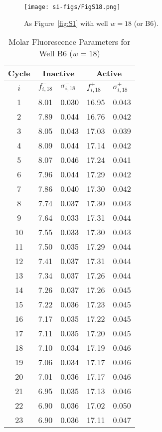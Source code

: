                 \begin{figure}
                    \centering
                    \texttt{[image: si-figs/FigS18.png]}
                    \caption{
                        As Figure~\ref{fig:S1} with well $w=18$ (or B6).
                    }
                \end{figure}
                \clearpage
    \begin{table}
        \caption{Molar Fluorescence Parameters for Well B6 ($w=18$)}
        \centering
        \begin{tabular}{c|ll|ll}
            Cycle & \multicolumn{2}{c|}{Inactive} & \multicolumn{2}{c}{Active} \\
            \hline
            $i$ & $f_{i,18}^{-}$ & $\sigma_{i,18}^{-}$ &  $f_{i,18}^{+}$ & $\sigma_{i,18}^{+}$ \\
            \hline
    1 & 8.01 & 0.030 & 16.95 & 0.043 \\
2 & 7.89 & 0.044 & 16.76 & 0.042 \\
3 & 8.05 & 0.043 & 17.03 & 0.039 \\
4 & 8.09 & 0.044 & 17.14 & 0.042 \\
5 & 8.07 & 0.046 & 17.24 & 0.041 \\
6 & 7.96 & 0.044 & 17.29 & 0.042 \\
7 & 7.86 & 0.040 & 17.30 & 0.042 \\
8 & 7.74 & 0.037 & 17.30 & 0.043 \\
9 & 7.64 & 0.033 & 17.31 & 0.044 \\
10 & 7.55 & 0.033 & 17.30 & 0.043 \\
11 & 7.50 & 0.035 & 17.29 & 0.044 \\
12 & 7.41 & 0.037 & 17.31 & 0.044 \\
13 & 7.34 & 0.037 & 17.26 & 0.044 \\
14 & 7.26 & 0.037 & 17.26 & 0.045 \\
15 & 7.22 & 0.036 & 17.23 & 0.045 \\
16 & 7.17 & 0.035 & 17.22 & 0.045 \\
17 & 7.11 & 0.035 & 17.20 & 0.045 \\
18 & 7.10 & 0.034 & 17.19 & 0.046 \\
19 & 7.06 & 0.034 & 17.17 & 0.046 \\
20 & 7.01 & 0.036 & 17.17 & 0.046 \\
21 & 6.95 & 0.035 & 17.13 & 0.046 \\
22 & 6.90 & 0.036 & 17.02 & 0.050 \\
23 & 6.90 & 0.036 & 17.11 & 0.047 \\

\end{tabular}
\end{table}
